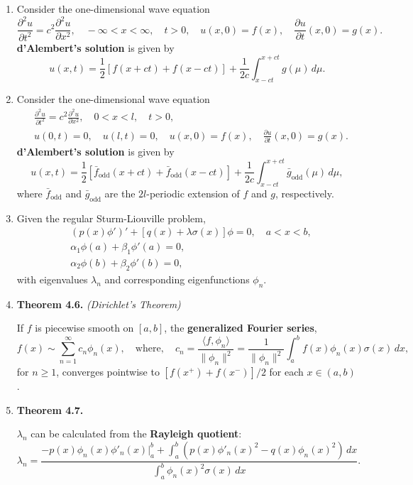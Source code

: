 \begin{enumerate}
\item Consider the one-dimensional wave equation
\[\frac{\partial^{2} u}{\partial t^{2}} = c^{2} \frac{\partial^{2} u}{\partial x^{2}}, \quad -\infty<x<\infty, \quad t>0, \quad u(x,0)=f(x), \quad \frac{\partial u}{\partial t}(x,0)=g(x).\]
\textbf{d'Alembert's solution} is given by
\[u(x,t)= \frac{1}{2}[f(x+ct)+f(x-ct)] + \frac{1}{2c} \int _{x-ct}^{x+ct} g(\mu)\, d\mu.\]

\item Consider the one-dimensional wave equation
\[
\begin{aligned}
& \frac{\partial^{2} u}{\partial t^{2}} = c^{2} \frac{\partial^{2} u}{\partial x^{2}}, \quad 0<x<l, \quad t>0, \\
& u(0,t)=0, \quad  u(l,t)=0, \quad u(x,0)=f(x), \quad \frac{\partial u}{\partial t}(x,0)=g(x).\end{aligned}
\]
\textbf{d'Alembert's solution} is given by
\[u(x,t)= \frac{1}{2}[\bar f_{\text{odd}}(x+ct)+ \bar f_{\text{odd}}(x-ct)] + \frac{1}{2c}\int _{x-ct}^{x+ct} \bar g_{\text{odd}}(\mu)\, d\mu,\]
where $\bar f_{\text{odd}}$ and $\bar g _{\text{odd}}$ are the $2l$-periodic extension of $f$ and $g$, respectively.



\item Given the regular Sturm-Liouville problem,
\begin{align*}
& (p(x)\phi ' ) ' + [q(x) + \lambda \sigma(x)]\phi = 0, \quad a < x < b,\\
& \alpha _1 \phi(a) + \beta _1 \phi ' (a) = 0, \\
& \alpha _2 \phi(b) + \beta _2 \phi ' (b) = 0,
\end{align*}
with eigenvalues $\lambda_{n}$ and corresponding eigenfunctions $\phi_{n}$.

\item \textbf{Theorem 4.6.} \textit{(Dirichlet's Theorem)}

If $f$ is piecewise smooth on $[a, b]$, the \textbf{generalized Fourier series},
\[
f(x)\sim \sum_{n=1}^{\infty} c_{n}\phi_{n}(x), \quad 
\text{where}, \quad
c_{n}=\frac{\langle f, \phi_{n}\rangle}{\|\phi_{n}\|^{2}} = \frac{1}{\|\phi_{n}\|^{2}}\int_{a}^{b} f(x)\phi_{n}(x)\sigma(x)\,dx,
\]
for $n \geq 1$, converges pointwise to $[f (x ^{+} ) + f (x ^{-} )]/2$ for each $x \in (a, b)$.



\item \textbf{Theorem 4.7.} 

$\lambda _{n}$ can be calculated from the \textbf{Rayleigh quotient}:
\[
\lambda_{n} = \frac{ \displaystyle -p(x)\phi_{n}(x)\phi'_{n}(x)\Big|_{a}^{b} + \int_{a}^{b}(p(x)\phi'_{n}(x)^{2} - q(x)\phi_{n}(x)^{2}) \, dx }{ \displaystyle \int_{a}^{b}\phi_{n}(x)^{2}\sigma(x)\, dx}.
\]



\end{enumerate}
